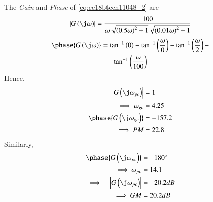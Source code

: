 The  {\em Gain} and {\em Phase} of \eqref{eq:ee18btech11048_2} are
\begin{align}
\abs{G\brak{\j\omega}}  =  \frac{100}{\omega\sqrt{\brak{0.5\omega}^2+1}\sqrt{\brak{0.01\omega}^2+1}}
\label{eq:ee18btech11048_2}
\end{align}
\begin{multline}
\phase{G\brak{\j\omega}}  =  \tan^{-1} \brak{0}-\tan^{-1} \brak{\frac{\omega}{0}} - \tan^{-1} \brak{\frac{\omega}{2}}- \\\tan^{-1} \brak{\frac{\omega}{100}} 
\label{eq:ee18btech11048_3}
\end{multline}
Hence, 
\begin{align}
\abs{G\brak{\j\omega_{gc}}}  &=  1
\\
\implies \omega_{gc} &= 4.25  
\\
\phase{ G\brak{\j\omega_{gc}}} &= -157.2 \\
\implies PM &= 22.8 
\end{align}
%
Similarly, 
\begin{align}
\phase{G\brak{\j\omega_{pc}}}  &= -180\degree
\\
\implies
\omega_{pc} &=  14.1 \\
\implies -\abs{G\brak{\j\omega_{pc}}}  &= -20.2 dB \\
\implies
GM &= 20.2 dB
\end{align}

